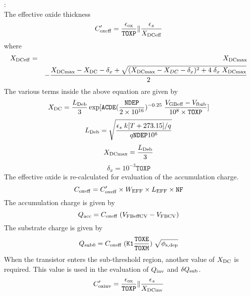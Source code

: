 \documentclass{article}
\begin{document}
:\\
The effective oxide thickness
\begin{equation}
C^{\prime}_{\rm{oxeff}}= {\epsilon_{\rm{ox}} \over \texttt{TOXP}}
\| {\epsilon_s \over X_{\rm{DCeff}}}
\end{equation}
where
\begin{eqnarray}
X_{\rm{DCeff}} & = & X_{\rm{DCmax}}  \\
& &- {X_{\rm{DCmax}} - X_{\rm{DC}} - \delta_x +
\sqrt{(X_{\rm{DCmax}} - X_{DC} - \delta_x )^2 + 4 \; \delta_x \;
X_{\rm{DCmax}}} \over 2} \nonumber
\end{eqnarray}
The various terms inside the above equation are given by
\begin{equation}
X_{\rm{DC}} = {L_{\rm{Deb}} \over 3}
\exp[\texttt{ACDE}({\texttt{NDEP} \over 2 \times 10^{16}})^{-0.25}
\; {V_{\rm{GBeff}} - V_{\rm{fbzb}}\over 10^8 \times
\texttt{TOXP}}]
\end{equation}
\begin{equation}
L_{\rm{Deb}} = \sqrt{{\epsilon_s \;k [T + 273.15]/q \over q
\texttt{NDEP} 10^6}}
\end{equation}
\begin{equation}
X_{\rm{DCmax}} = {L_{\rm{Deb}} \over 3}
\end{equation}
\begin{equation}
\delta_x = 10^{-3} \texttt{TOXP}
\end{equation}
The effective oxide is re-calculated for evaluation of the
accumulation charge.
\begin{equation}
C_{\rm{oxeff}} = C^{\prime}_{\rm{oxeff}} \times W_{\rm{EFF}}
\times L_{\rm{EFF}} \times \texttt{NF}
\end{equation}
The accumulation charge is given by
\begin{equation}
Q_{\rm{acc}} = C_{\rm{oxeff}}\;(V_{\rm{FBeffCV}} - V_{\rm{FBCV}})
\end{equation}
The substrate charge is given by
\begin{equation}
Q_{\rm{sub0}}= C_{\rm{oxeff}}\; (\texttt{K1} {\texttt{TOXE} \over
\texttt{TOXM}}) \; \sqrt{\phi_{\rm{s,dep}}}
\end{equation}
When the transistor enters the sub-threshold region, another value
of $X_{\rm{DC}}$ is required. This value is used in the evaluation
of $Q_{\rm{inv}}$ and $\delta Q_{\rm{sub}}$.
\begin{equation}
C^{\prime}_{\rm{oxinv}}= {\epsilon_{\rm{ox}} \over \texttt{TOXP}}
\| {\epsilon_s \over X_{\rm{DCinv}}}
\end{equation}
\end{document}
